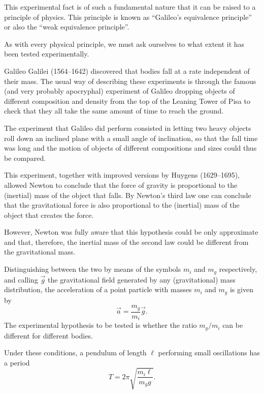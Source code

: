 \begin{points}
\item This experimental fact is of such a fundamental nature that it can be raised to a principle of physics. This principle is known as ``Galileo's equivalence principle'' or also the ``weak equivalence principle''.

\item As with every physical principle, we must ask ourselves to what extent it has been tested experimentally.

\item Galileo Galilei (1564--1642) discovered that bodies fall at a rate independent of their mass. The usual way of describing these experiments is through the famous (and very probably apocryphal) experiment of Galileo dropping objects of different composition and density from the top of the Leaning Tower of Pisa to check that they all take the same amount of time to reach the ground.

\item The experiment that Galileo did perform consisted in letting two heavy objects roll down an inclined plane with a small angle of inclination, so that the fall time was long and the motion of objects of different compositions and sizes could thus be compared.

\item This experiment, together with improved versions by Huygens (1629--1695), allowed Newton to conclude that the force of gravity is proportional to the (inertial) mass of the object that falls. By Newton's third law one can conclude that the gravitational force is also proportional to the (inertial) mass of the object that creates the force.

\item However, Newton was fully aware that this hypothesis could be only approximate and that, therefore, the inertial mass of the second law could be different from the gravitational mass.

\item Distinguishing between the two by means of the symbols $m_i$ and $m_g$ respectively, and calling $\vec g$ the gravitational field generated by any (gravitational) mass distribution, the acceleration of a point particle with masses $m_i$ and $m_g$ is given by
\[
  \vec a=\frac{m_g}{m_i}\vec g .
\]
The experimental hypothesis to be tested is whether the ratio $m_g/m_i$ can be different for different bodies.

\item Under these conditions, a pendulum of length $\ell$ performing small oscillations has a period
\[
  T=2\pi\sqrt{\frac{m_i\ell}{m_gg}} .
\]


\end{points}

